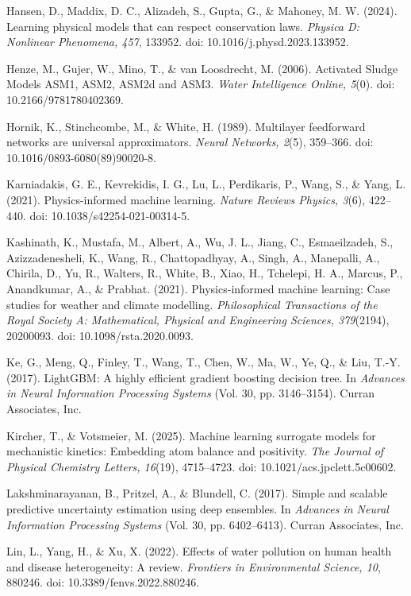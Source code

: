\documentclass[a4paper,fleqn]{cas-sc}
\begin{document}
\noindent Hansen, D., Maddix, D. C., Alizadeh, S., Gupta, G., \& Mahoney, M. W. (2024). Learning physical models that can respect conservation laws. \textit{Physica D: Nonlinear Phenomena, 457}, 133952. doi: 10.1016/j.physd.2023.133952.

\noindent Henze, M., Gujer, W., Mino, T., \& van Loosdrecht, M. (2006). Activated Sludge Models ASM1, ASM2, ASM2d and ASM3. \textit{Water Intelligence Online, 5}(0). doi: 10.2166/9781780402369.

\noindent Hornik, K., Stinchcombe, M., \& White, H. (1989). Multilayer feedforward networks are universal approximators. \textit{Neural Networks, 2}(5), 359--366. doi: 10.1016/0893-6080(89)90020-8.

\noindent Karniadakis, G. E., Kevrekidis, I. G., Lu, L., Perdikaris, P., Wang, S., \& Yang, L. (2021). Physics-informed machine learning. \textit{Nature Reviews Physics, 3}(6), 422--440. doi: 10.1038/s42254-021-00314-5.

\noindent Kashinath, K., Mustafa, M., Albert, A., Wu, J. L., Jiang, C., Esmaeilzadeh, S., Azizzadenesheli, K., Wang, R., Chattopadhyay, A., Singh, A., Manepalli, A., Chirila, D., Yu, R., Walters, R., White, B., Xiao, H., Tchelepi, H. A., Marcus, P., Anandkumar, A., \& Prabhat. (2021). Physics-informed machine learning: Case studies for weather and climate modelling. \textit{Philosophical Transactions of the Royal Society A: Mathematical, Physical and Engineering Sciences, 379}(2194), 20200093. doi: 10.1098/rsta.2020.0093.

\noindent Ke, G., Meng, Q., Finley, T., Wang, T., Chen, W., Ma, W., Ye, Q., \& Liu, T.-Y. (2017). LightGBM: A highly efficient gradient boosting decision tree. In \textit{Advances in Neural Information Processing Systems} (Vol. 30, pp. 3146--3154). Curran Associates, Inc.

\noindent Kircher, T., \& Votsmeier, M. (2025). Machine learning surrogate models for mechanistic kinetics: Embedding atom balance and positivity. \textit{The Journal of Physical Chemistry Letters, 16}(19), 4715--4723. doi: 10.1021/acs.jpclett.5c00602.

\noindent Lakshminarayanan, B., Pritzel, A., \& Blundell, C. (2017). Simple and scalable predictive uncertainty estimation using deep ensembles. In \textit{Advances in Neural Information Processing Systems} (Vol. 30, pp. 6402--6413). Curran Associates, Inc.

\noindent Lin, L., Yang, H., \& Xu, X. (2022). Effects of water pollution on human health and disease heterogeneity: A review. \textit{Frontiers in Environmental Science, 10}, 880246. doi: 10.3389/fenvs.2022.880246.
\end{document}
